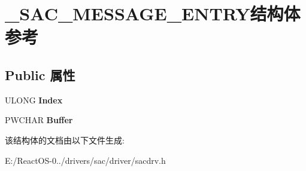 \hypertarget{struct___s_a_c___m_e_s_s_a_g_e___e_n_t_r_y}{}\section{\+\_\+\+S\+A\+C\+\_\+\+M\+E\+S\+S\+A\+G\+E\+\_\+\+E\+N\+T\+R\+Y结构体 参考}
\label{struct___s_a_c___m_e_s_s_a_g_e___e_n_t_r_y}
\subsection*{Public 属性}
\begin{DoxyCompactItemize}
\item 
\mbox{\label{struct___s_a_c___m_e_s_s_a_g_e___e_n_t_r_y_a89cc986a4e1234adae587c4925d6e2a6}} 
U\+L\+O\+NG {\bfseries Index}
\item 
\mbox{\label{struct___s_a_c___m_e_s_s_a_g_e___e_n_t_r_y_adc138a2bd85df3649c71009833023df0}} 
P\+W\+C\+H\+AR {\bfseries Buffer}
\end{DoxyCompactItemize}


该结构体的文档由以下文件生成\+:\begin{DoxyCompactItemize}
\item 
E\+:/\+React\+O\+S-\/0../drivers/sac/driver/sacdrv.\+h\end{DoxyCompactItemize}
